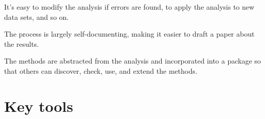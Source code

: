\documentclass[]{article}
\begin{document}
It's easy to modify the analysis if errors are found, to apply the
analysis to new data sets, and so on.

The process is largely self-documenting, making it easier to draft a
paper about the results.

The methods are abstracted from the analysis and incorporated into a
package so that others can discover, check, use, and extend the
methods.

\section{Key tools}\label{key-tools}

\end{document}
